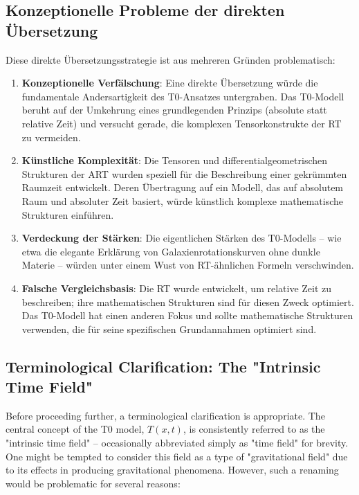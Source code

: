 \documentclass[12pt,a4paper]{article}
\newcommand{\Tfieldt}{T(x,t)}
\begin{document}
	\subsection{Konzeptionelle Probleme der direkten Übersetzung}
	\label{subsec:conceptual_problems}
	
	Diese direkte Übersetzungsstrategie ist aus mehreren Gründen problematisch:
	
	\begin{enumerate}
		\item \textbf{Konzeptionelle Verfälschung}: Eine direkte Übersetzung würde die fundamentale Andersartigkeit des T0-Ansatzes untergraben. Das T0-Modell beruht auf der Umkehrung eines grundlegenden Prinzips (absolute statt relative Zeit) und versucht gerade, die komplexen Tensorkonstrukte der RT zu vermeiden.
		
		\item \textbf{Künstliche Komplexität}: Die Tensoren und differentialgeometrischen Strukturen der ART wurden speziell für die Beschreibung einer gekrümmten Raumzeit entwickelt. Deren Übertragung auf ein Modell, das auf absolutem Raum und absoluter Zeit basiert, würde künstlich komplexe mathematische Strukturen einführen.
		
		\item \textbf{Verdeckung der Stärken}: Die eigentlichen Stärken des T0-Modells – wie etwa die elegante Erklärung von Galaxienrotationskurven ohne dunkle Materie – würden unter einem Wust von RT-ähnlichen Formeln verschwinden.
		
		\item \textbf{Falsche Vergleichsbasis}: Die RT wurde entwickelt, um relative Zeit zu beschreiben; ihre mathematischen Strukturen sind für diesen Zweck optimiert. Das T0-Modell hat einen anderen Fokus und sollte mathematische Strukturen verwenden, die für seine spezifischen Grundannahmen optimiert sind.
	\end{enumerate}
	
	\subsection{Terminological Clarification: The "Intrinsic Time Field"}
	\label{subsec:terminology}
	
	Before proceeding further, a terminological clarification is appropriate. The central concept of the T0 model, $\Tfieldt$, is consistently referred to as the "intrinsic time field" – occasionally abbreviated simply as "time field" for brevity. One might be tempted to consider this field as a type of "gravitational field" due to its effects in producing gravitational phenomena. However, such a renaming would be problematic for several reasons:
	
\end{document}
